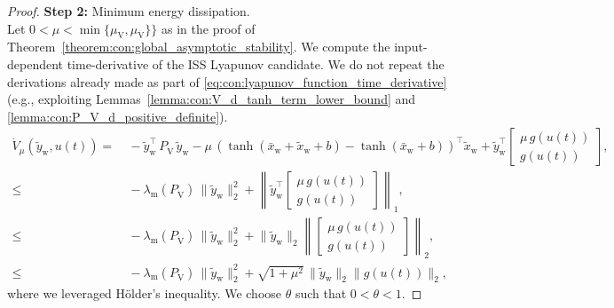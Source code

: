 \begin{proof}
    \textbf{Step 2:} Minimum energy dissipation.\\
    Let $0 < \mu < \min \{ \mu_{\mathrm{V}}, \mu_{\dot{\mathrm{V}}} \}\}$ as in the proof of Theorem~\ref{theorem:con:global_asymptotic_stability}.
    We compute the input-dependent time-derivative of the ISS Lyapunov candidate. We do not repeat the derivations already made as part of \eqref{eq:con:lyapunov_function_time_derivative} (e.g., exploiting Lemmas~\ref{lemma:con:V_d_tanh_term_lower_bound} and \ref{lemma:con:P_V_d_positive_definite}).
    \begin{equation}
    \begin{split}
        \dot{V}_\mu(\tilde{y}_\mathrm{w}, u(t)) =& \: %
        -\tilde{y}_\mathrm{w}^\top \, P_{\dot{\mathrm{V}}} \, \tilde{y}_\mathrm{w} - \mu \, \left ( \tanh(\bar{x}_\mathrm{w} + \tilde{x}_\mathrm{w} + b) - \tanh(\bar{x}_\mathrm{w} + b) \right )^\top \tilde{x}_\mathrm{w} + \tilde{y}_\mathrm{w}^\top \begin{bmatrix}
            \mu \, g(u(t))\\
            g(u(t))
        \end{bmatrix},\\
        \leq& \: -\lambda_\mathrm{m}\left(P_{\dot{\mathrm{V}}} \right) \, \lVert \tilde{y}_\mathrm{w} \rVert_2^2 + \left \lVert \tilde{y}_\mathrm{w}^\top\begin{bmatrix}\mu \, g(u(t))\\ g(u(t)) \end{bmatrix} \right \rVert_1,\\
        \leq& \: -\lambda_\mathrm{m}\left(P_{\dot{\mathrm{V}}} \right) \, \lVert \tilde{y}_\mathrm{w} \rVert_2^2 +  \lVert \tilde{y}_\mathrm{w} \rVert_2 \left \lVert \begin{bmatrix}\mu \, g(u(t))\\ g(u(t)) \end{bmatrix} \right \rVert_2,\\
        \leq& \: -\lambda_\mathrm{m}\left(P_{\dot{\mathrm{V}}} \right) \, \lVert \tilde{y}_\mathrm{w} \rVert_2^2 + \sqrt{1+\mu^2} \, \lVert \tilde{y}_\mathrm{w} \rVert_2 \lVert g(u(t)) \rVert_2,
    \end{split}
    \end{equation}
    where we leveraged Hölder's inequality. We choose $\theta$ such that $0 < \theta < 1$.

\end{proof}
